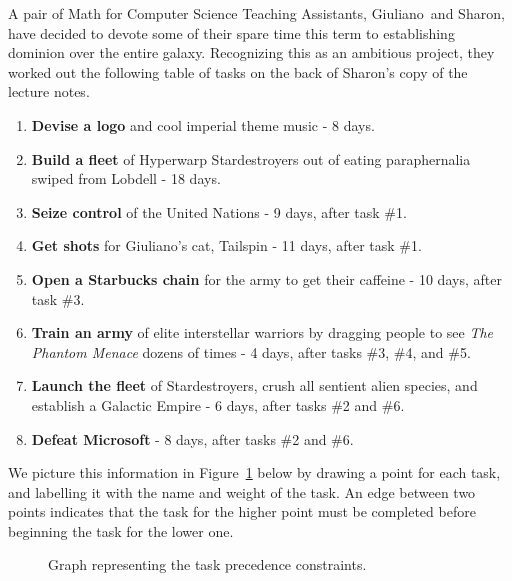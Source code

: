 
\begin{pcomments}
\end{pcomments}


\newcommand{\Jay}{Giuliano}
\newcommand{\Rongrong}{Sharon}


\begin{problem}
A pair of Math for Computer Science Teaching Assistants, \Jay\ and
\Rongrong, have decided to devote some of their spare time this term
to establishing dominion over the entire galaxy.  Recognizing this as
an ambitious project, they worked out the following table of tasks on
the back of \Rongrong's copy of the lecture notes.

\begin{enumerate}
\item \textbf{Devise a logo} and cool imperial theme music - 8 days.
\item \textbf{Build a fleet} of Hyperwarp Stardestroyers out of eating
  paraphernalia swiped from Lobdell - 18 days.
\item \textbf{Seize control} of the United Nations - 9 days, after task \#1.
\item \textbf{Get shots} for \Jay's cat, Tailspin - 11 days, after task \#1.
\item \textbf{Open a Starbucks chain} for the army to get their caffeine - 10 
days, after task \#3.
\item \textbf{Train an army} of elite interstellar warriors by dragging
people to see \emph{The Phantom Menace} dozens of times - 4 days, after
tasks \#3, \#4, and \#5.
\item \textbf{Launch the fleet} of Stardestroyers, crush all sentient
alien species, and establish a Galactic Empire - 6 days, after tasks \#2 and
\#6.
\item \textbf{Defeat Microsoft} - 8 days, after tasks \#2 and \#6.
\end{enumerate}

We picture this information in Figure~\ref{fig:tasks} below by drawing a
point for each task, and labelling it with the name and weight of the
task.  An edge between two points indicates that the task for the higher
point must be completed before beginning the task for the lower one.
    \begin{figure}[htbp]
    \begin{center}
    \unitlength=0.047pt
    
    \end{center}
    \caption{Graph representing the task precedence constraints.}
    \label{fig:tasks}
    \end{figure}


\end{problem}
